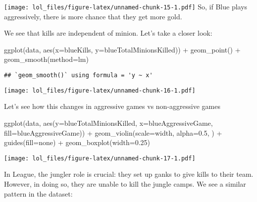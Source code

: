 \documentclass[
]{article}
\newenvironment{Shaded}{\begin{snugshade}}{\end{snugshade}}
\newcommand{\AttributeTok}[1]{\textcolor[rgb]{0.77,0.63,0.00}{#1}}
\newcommand{\FloatTok}[1]{\textcolor[rgb]{0.00,0.00,0.81}{#1}}
\newcommand{\FunctionTok}[1]{\textcolor[rgb]{0.00,0.00,0.00}{#1}}
\newcommand{\NormalTok}[1]{#1}
\newcommand{\SpecialCharTok}[1]{\textcolor[rgb]{0.00,0.00,0.00}{#1}}
\newcommand{\StringTok}[1]{\textcolor[rgb]{0.31,0.60,0.02}{#1}}
\begin{document}
\texttt{[image: lol\_files/figure-latex/unnamed-chunk-15-1.pdf]} So, if
Blue plays aggressively, there is more chance that they get more gold.

We see that kills are independent of minion. Let's take a closer look:

\begin{Shaded}
\begin{Highlighting}[]
\FunctionTok{ggplot}\NormalTok{(data, }\FunctionTok{aes}\NormalTok{(}\AttributeTok{x=}\NormalTok{blueKills, }\AttributeTok{y=}\NormalTok{blueTotalMinionsKilled)) }\SpecialCharTok{+} 
  \FunctionTok{geom\_point}\NormalTok{() }\SpecialCharTok{+}
  \FunctionTok{geom\_smooth}\NormalTok{(}\AttributeTok{method=}\StringTok{\textquotesingle{}lm\textquotesingle{}}\NormalTok{)}
\end{Highlighting}
\end{Shaded}

\begin{verbatim}
## `geom_smooth()` using formula = 'y ~ x'
\end{verbatim}

\texttt{[image: lol\_files/figure-latex/unnamed-chunk-16-1.pdf]}

Let's see how this changes in aggressive games vs non-aggressive games

\begin{Shaded}
\begin{Highlighting}[]
\FunctionTok{ggplot}\NormalTok{(data, }\FunctionTok{aes}\NormalTok{(}\AttributeTok{y=}\NormalTok{blueTotalMinionsKilled, }\AttributeTok{x=}\NormalTok{blueAggressiveGame, }\AttributeTok{fill=}\NormalTok{blueAggressiveGame)) }\SpecialCharTok{+} 
  \FunctionTok{geom\_violin}\NormalTok{(}\AttributeTok{scale=}\StringTok{\textquotesingle{}width\textquotesingle{}}\NormalTok{, }\AttributeTok{alpha=}\FloatTok{0.5}\NormalTok{, ) }\SpecialCharTok{+}
  \FunctionTok{guides}\NormalTok{(}\AttributeTok{fill=}\StringTok{\textquotesingle{}none\textquotesingle{}}\NormalTok{) }\SpecialCharTok{+} 
  \FunctionTok{geom\_boxplot}\NormalTok{(}\AttributeTok{width=}\FloatTok{0.25}\NormalTok{)}
\end{Highlighting}
\end{Shaded}

\texttt{[image: lol\_files/figure-latex/unnamed-chunk-17-1.pdf]}

In League, the jungler role is crucial: they set up ganks to give kills
to their team. However, in doing so, they are unable to kill the jungle
camps. We see a similar pattern in the dataset:
\end{document}
